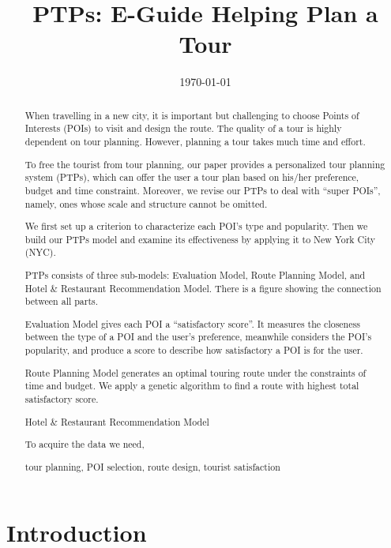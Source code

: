 \documentclass{mcmthesis}
\begin{document}
\linespread{0.6}
\setlength{\parskip}{0.5\baselineskip}
\title{PTPs: E-Guide Helping Plan a Tour}%

\date{\today}
\begin{abstract}
    When travelling in a new city, it is important but challenging to choose Points of Interests (POIs) to visit and design the route. The quality of a tour is highly dependent on tour planning. However, planning a tour takes much time and effort. \par
  To free the tourist from tour planning, our paper provides a personalized tour planning system (PTPs), which can offer the user a tour plan based on his/her preference, budget and time constraint. Moreover, we revise our PTPs to deal with ``super POIs'', namely, ones whose scale and structure cannot be omitted. \par
  We first set up a criterion to characterize each POI's type and popularity. Then we build our PTPs model and examine its effectiveness by applying it to New York City (NYC).\par
  PTPs consists of three sub-models: Evaluation Model, Route Planning Model, and Hotel \& Restaurant Recommendation Model. There is a figure showing the connection between all parts.\par
  Evaluation Model gives each POI a ``satisfactory score''. It measures the closeness between the type of a POI and the user's preference, meanwhile considers the POI's popularity, and produce a score to describe how satisfactory a POI is for the user.\par
  Route Planning Model generates an optimal touring route under the constraints of time and budget. We apply a genetic algorithm to find a route with highest total satisfactory score. \par
  Hotel \& Restaurant Recommendation Model 

  To acquire the data we need, 
	\begin{keywords}
    tour planning, POI selection, route design, tourist satisfaction
	\end{keywords}
\end{abstract}

\maketitle
\tableofcontents

\newpage

\section{Introduction}	
\end{document}
